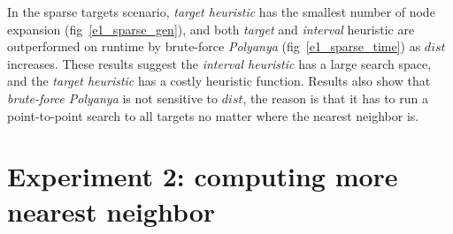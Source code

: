 In the sparse targets scenario, \textit{target heuristic} has the smallest number of node
expansion (fig~\ref{e1_sparse_gen}), 
and both \textit{target} and \textit{interval} heuristic are outperformed on runtime by brute-force \textit{Polyanya} (fig~\ref{e1_sparse_time}) as $dist$ increases.
These results suggest the \textit{interval heuristic} has a large search space, and the
\textit{target heuristic} has a costly heuristic function. Results also show that \textit{brute-force Polyanya} is
not sensitive to $dist$, the reason is that it has to run a point-to-point search to all
targets no matter where the nearest neighbor is. 

\section{Experiment 2: computing more nearest neighbor}\label{exp2}
